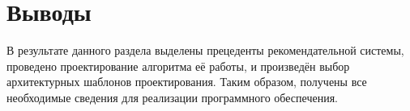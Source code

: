 \section*{Выводы}
В результате данного раздела выделены прецеденты рекомендательной системы, проведено проектирование алгоритма её работы, и произведён выбор архитектурных шаблонов проектирования.
Таким образом, получены все необходимые сведения для реализации программного обеспечения.

